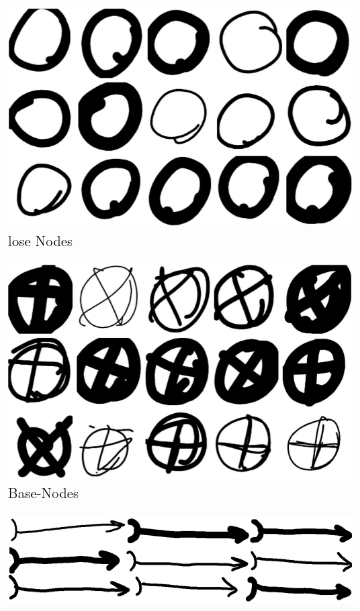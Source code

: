 \begin{figure}
  \centering
    \begin{subfigure}[b]{0.4\textwidth}
        \includegraphics[width=\textwidth]{images/os.png}
        \caption{lose Nodes}
        \label{fig:os}
    \end{subfigure}
    \begin{subfigure}[b]{0.4\textwidth}
        \includegraphics[width=\textwidth]{images/xs.png}
        \caption{Base-Nodes}
        \label{fig:xs}
    \end{subfigure}
    \begin{subfigure}[b]{0.4\textwidth}
      \includegraphics[width=\textwidth]{images/rs.png}

\end{subfigure}
\end{figure}
